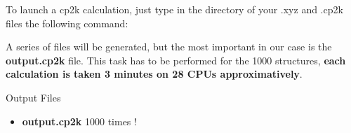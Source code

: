 \documentclass[12pt]{article}
\begin{document}
To launch a cp2k calculation, just type in the directory of your .xyz and .cp2k files the following command:
\begin{center}
\end{center}
A series of files will be generated, but the most important in our case is the \textbf{output.cp2k} file. This task has to be performed for the 1000 structures, \textbf{each calculation is taken 3 minutes on 28 CPUs approximatively}. 
\\
\begin{mybox3}{Output Files}
\begin{itemize}
    \item \textbf{output.cp2k} 1000 times !
\end{itemize}
\end{mybox3}
%
\end{document}
